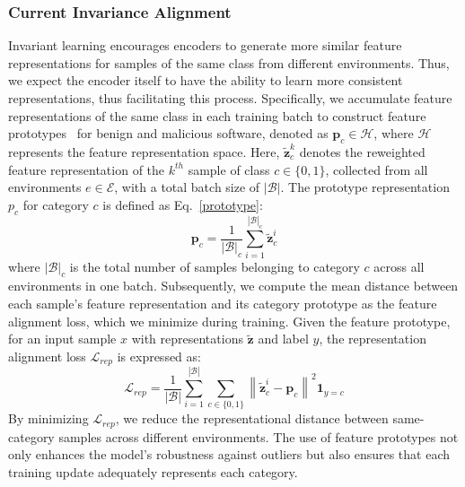 \subsubsection{Current Invariance Alignment}
Invariant learning encourages encoders to generate more similar feature representations for samples of the same class from different environments. Thus, we expect the encoder itself to have the ability to learn more consistent representations, thus facilitating this process. Specifically, we accumulate feature representations of the same class in each training batch to construct feature prototypes~\cite{prototype} for benign and malicious software, denoted as $\mathbf{p}_c \in \mathcal{H}$, where $\mathcal{H}$ represents the feature representation space. Here, $\tilde{\mathbf{z}}^{k}_{c}$ denotes the reweighted feature representation of the $k^{th}$ sample of class $c \in \{0, 1\}$, collected from all environments $e \in \mathcal{E}$, with a total batch size of $|\mathcal{B}|$. The prototype representation $p_c$ for category $c$ is defined as Eq.~\ref{prototype}:
\begin{equation}
\label{prototype}
\mathbf{p}_c=\frac{1}{|\mathcal{B}|_c} \sum_{i=1}^{|\mathcal{B}|_c} \tilde{\mathbf{z}}^{i}_{c}
\end{equation}
where $|\mathcal{B}|_c$ is the total number of samples belonging to category $c$ across all environments in one batch. Subsequently, we compute the mean distance between each sample's feature representation and its category prototype as the feature alignment loss, which we minimize during training. Given the feature prototype, for an input sample $x$ with representations $\tilde{\mathbf{z}}$ and label $y$, the representation alignment loss $\mathcal{L}_{rep}$ is expressed as:
\begin{equation}
\mathcal{L}_{rep}=\frac{1}{|\mathcal{B}|} \sum_{i=1}^{|\mathcal{B}|} \sum_{c \in \{0, 1\}}\left\|\tilde{\mathbf{z}}^{i}_{c}-\mathbf{p}_c\right\|^2 \mathbf{1}_{y=c}
\end{equation}
By minimizing $\mathcal{L}_{rep}$, we reduce the representational distance between same-category samples across different environments. The use of feature prototypes not only enhances the model's robustness against outliers but also ensures that each training update adequately represents each category.

